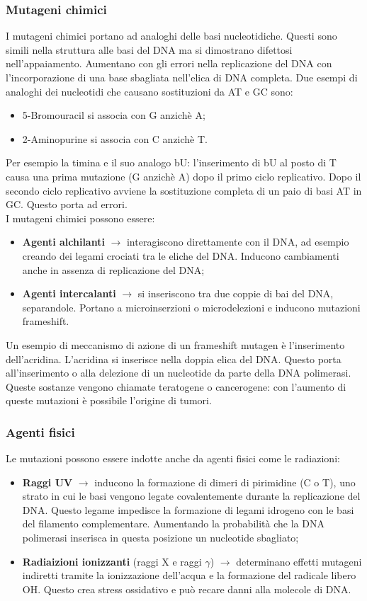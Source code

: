 \subsubsection{Mutageni chimici}
I mutageni chimici portano ad analoghi delle basi nucleotidiche. Questi sono simili nella struttura alle basi del DNA ma si dimostrano difettosi nell'appaiamento. Aumentano con gli errori nella replicazione del DNA con l'incorporazione di una base sbagliata nell'elica di DNA completa. Due esempi di analoghi dei nucleotidi che causano sostituzioni da AT e GC sono:
\begin{itemize}
    \item 5-Bromouracil si associa con G anzichè A; 
    \item 2-Aminopurine si associa con C anzichè T. 
\end{itemize}
Per esempio la timina e il suo analogo bU: l'inserimento di bU al posto di T causa una prima mutazione (G anzichè A) dopo il primo ciclo replicativo. Dopo il secondo ciclo replicativo avviene la sostituzione completa di un paio di basi AT in GC. Questo porta ad errori. 
\\I mutageni chimici possono essere:
\begin{itemize}
    \item \textbf{Agenti alchilanti} $\xrightarrow{}$ interagiscono direttamente con il DNA, ad esempio creando dei legami crociati tra le eliche del DNA. Inducono cambiamenti anche in assenza di replicazione del DNA; 
    \item \textbf{Agenti intercalanti} $\xrightarrow{}$ si inseriscono tra due coppie di bai del DNA, separandole. Portano a microinserzioni o microdelezioni e inducono mutazioni frameshift. 
\end{itemize}
Un esempio di meccanismo di azione di un frameshift mutagen è l'inserimento dell'acridina. L'acridina si inserisce nella doppia elica del DNA. Questo porta all'inserimento o alla delezione di un nucleotide da parte della DNA polimerasi. 
\\Queste sostanze vengono chiamate teratogene o cancerogene: con l'aumento di queste mutazioni è possibile l'origine di tumori. 
\subsubsection{Agenti fisici}
Le mutazioni possono essere indotte anche da agenti fisici come le radiazioni:
\begin{itemize}
    \item \textbf{Raggi UV} $\xrightarrow{}$ inducono la formazione di dimeri di pirimidine (C o T), uno strato in cui le basi vengono legate covalentemente durante la replicazione del DNA. Questo legame impedisce la formazione di legami idrogeno con le basi del filamento complementare. Aumentando la probabilità che la DNA polimerasi inserisca in questa posizione un nucleotide sbagliato; 
    \item \textbf{Radiaizioni ionizzanti} (raggi X e raggi $\gamma$) $\xrightarrow{}$ determinano effetti mutageni indiretti tramite la ionizzazione dell'acqua e la formazione del radicale libero OH\ap{-}. Questo crea stress ossidativo e può recare danni alla molecole di DNA.
\end{itemize}
